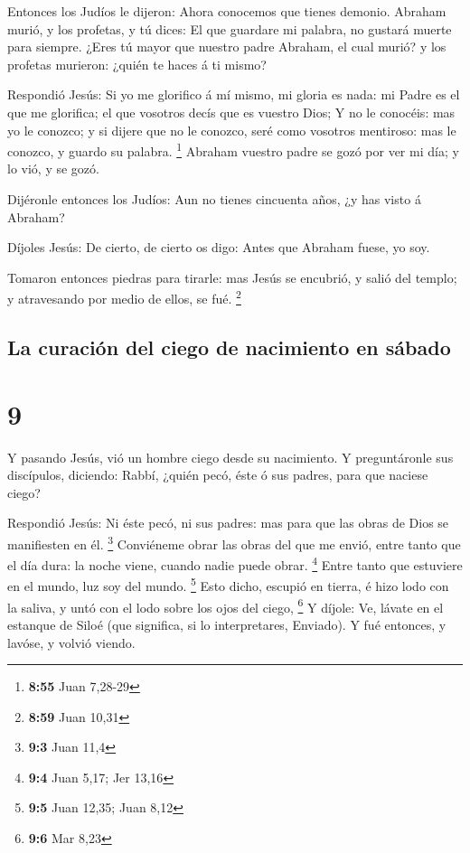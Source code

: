  Entonces los Judíos le dijeron: Ahora conocemos que tienes
demonio. Abraham murió, y los profetas, y tú dices: El que guardare mi
palabra, no gustará muerte para siempre.  ¿Eres tú mayor
que nuestro padre Abraham, el cual murió? y los profetas murieron:
¿quién te haces á ti mismo?

 Respondió Jesús: Si yo me glorifico á mí mismo, mi gloria
es nada: mi Padre es el que me glorifica; el que vosotros decís que es
vuestro Dios;  Y no le conocéis: mas yo le conozco; y si
dijere que no le conozco, seré como vosotros mentiroso: mas le conozco,
y guardo su palabra. \footnote{\textbf{8:55} Juan 7,28-29} 
Abraham vuestro padre se gozó por ver mi día; y lo vió, y se gozó.

 Dijéronle entonces los Judíos: Aun no tienes cincuenta
años, ¿y has visto á Abraham?

 Díjoles Jesús: De cierto, de cierto os digo: Antes que
Abraham fuese, yo soy.

 Tomaron entonces piedras para tirarle: mas Jesús se
encubrió, y salió del templo; y atravesando por medio de ellos, se fué.
\footnote{\textbf{8:59} Juan 10,31}

\hypertarget{la-curaciuxf3n-del-ciego-de-nacimiento-en-suxe1bado}{%
\subsection{La curación del ciego de nacimiento en
sábado}\label{la-curaciuxf3n-del-ciego-de-nacimiento-en-suxe1bado}}

\hypertarget{section-8}{%
\section{9}\label{section-8}}

 Y pasando Jesús, vió un hombre ciego desde su nacimiento.
 Y preguntáronle sus discípulos, diciendo: Rabbí, ¿quién
pecó, éste ó sus padres, para que naciese ciego?

 Respondió Jesús: Ni éste pecó, ni sus padres: mas para que
las obras de Dios se manifiesten en él. \footnote{\textbf{9:3} Juan 11,4}
 Conviéneme obrar las obras del que me envió, entre tanto
que el día dura: la noche viene, cuando nadie puede obrar. \footnote{\textbf{9:4}
  Juan 5,17; Jer 13,16}  Entre tanto que estuviere en el
mundo, luz soy del mundo. \footnote{\textbf{9:5} Juan 12,35; Juan 8,12}
 Esto dicho, escupió en tierra, é hizo lodo con la saliva, y
untó con el lodo sobre los ojos del ciego, \footnote{\textbf{9:6} Mar
  8,23}  Y díjole: Ve, lávate en el estanque de Siloé (que
significa, si lo interpretares, Enviado). Y fué entonces, y lavóse, y
volvió viendo.

